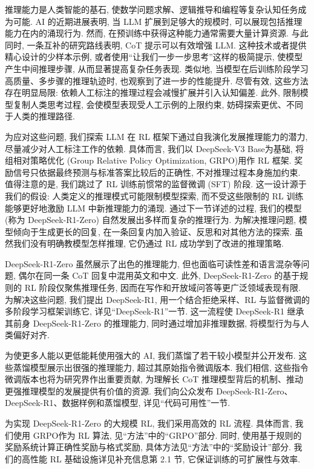 \label{r1n-main}
推理能力是人类智能的基石, 使数学问题求解、逻辑推导和编程等复杂认知任务成为可能. AI 的近期进展表明, 当 LLM 扩展到足够大的规模时, 可以展现包括推理能力在内的涌现行为\cite{r1n-ref4,r1n-ref5}. 然而, 在预训练中获得这种能力通常需要大量计算资源. 与此同时, 一条互补的研究路线表明, CoT 提示可以有效增强 LLM. 这种技术或者提供精心设计的少样本示例, 或者使用“让我们一步一步思考”这样的极简提示\cite{r1n-ref3,r1n-ref6}, 使模型产生中间推理步骤, 从而显著提高复杂任务表现. 类似地, 当模型在后训练阶段学习高质量、多步骤的推理轨迹时, 也观察到了进一步的性能提升\cite{r1n-ref2,r1n-ref7}. 尽管有效, 这些方法存在明显局限: 依赖人工标注的推理过程会减慢扩展并引入认知偏差. 此外, 限制模型复制人类思考过程, 会使模型表现受人工示例的上限约束, 妨碍探索更优、不同于人类的推理路径.

为应对这些问题, 我们探索 LLM 在 RL 框架下通过自我演化发展推理能力的潜力, 尽量减少对人工标注工作的依赖. 具体而言, 我们以 DeepSeek-V3 Base\cite{r1n-ref8}为基础, 将组相对策略优化 (Group Relative Policy Optimization, GRPO)\cite{r1n-ref9}用作 RL 框架. 奖励信号只依据最终预测与标准答案比较后的正确性, 不对推理过程本身施加约束. 值得注意的是, 我们跳过了 RL 训练前惯常的监督微调 (SFT) 阶段. 这一设计源于我们的假设: 人类定义的推理模式可能限制模型探索, 而不受这些限制的 RL 训练能够更好地激励 LLM 中新推理能力的涌现. 通过下一节详述的过程, 我们的模型 (称为 DeepSeek-R1-Zero) 自然发展出多样而复杂的推理行为. 为解决推理问题, 模型倾向于生成更长的回复, 在一条回复内加入验证、反思和对其他方法的探索. 虽然我们没有明确教模型怎样推理, 它仍通过 RL 成功学到了改进的推理策略.

DeepSeek-R1-Zero 虽然展示了出色的推理能力, 但也面临可读性差和语言混杂等问题, 偶尔在同一条 CoT 回复中混用英文和中文. 此外, DeepSeek-R1-Zero 的基于规则的 RL 阶段仅聚焦推理任务, 因而在写作和开放域问答等更广泛领域表现有限. 为解决这些问题, 我们提出 DeepSeek-R1, 用一个结合拒绝采样、RL 与监督微调的多阶段学习框架训练它, 详见“DeepSeek-R1”一节. 这一流程使 DeepSeek-R1 继承其前身 DeepSeek-R1-Zero 的推理能力, 同时通过增加非推理数据, 将模型行为与人类偏好对齐.

为使更多人能以更低能耗使用强大的 AI, 我们蒸馏了若干较小模型并公开发布. 这些蒸馏模型展示出很强的推理能力, 超过其原始指令微调版本. 我们相信, 这些指令微调版本也将为研究界作出重要贡献, 为理解长 CoT 推理模型背后的机制、推动更强推理模型的发展提供有价值的资源. 我们向公众发布 DeepSeek-R1-Zero、DeepSeek-R1、数据样例和蒸馏模型, 详见“代码可用性”一节.

\label{r1n-zero}
为实现 DeepSeek-R1-Zero 的大规模 RL, 我们采用高效的 RL 流程. 具体而言, 我们使用 GRPO\cite{r1n-ref9}作为 RL 算法, 见“方法”中的“GRPO”部分. 同时, 使用基于规则的奖励系统计算正确性奖励与格式奖励, 具体方法见“方法”中的“奖励设计”部分. 我们的高性能 RL 基础设施详见补充信息第 2.1 节, 它保证训练的可扩展性与效率.

